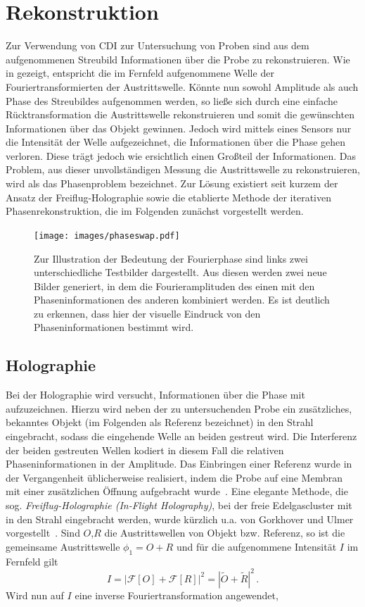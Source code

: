 \chapter{Rekonstruktion}
\label{chap:rekonstruktion}
Zur Verwendung von CDI zur Untersuchung von Proben sind aus dem aufgenommenen Streubild Informationen über die Probe zu rekonstruieren. Wie in  gezeigt, entspricht die im Fernfeld aufgenommene Welle der Fouriertransformierten der Austrittswelle. Könnte nun sowohl Amplitude als auch Phase des Streubildes aufgenommen werden, so ließe sich durch eine einfache Rücktransformation die Austrittswelle rekonstruieren und somit die gewünschten Informationen über das Objekt gewinnen. Jedoch wird mittels eines Sensors nur die Intensität der Welle aufgezeichnet, die Informationen über die Phase gehen verloren. Diese trägt jedoch wie  ersichtlich einen Großteil der Informationen. Das Problem, aus dieser unvollständigen Messung die Austrittswelle zu rekonstruieren, wird als das Phasenproblem bezeichnet. Zur Lösung existiert seit kurzem der Ansatz der Freiflug-Holographie sowie die etablierte Methode der iterativen Phasenrekonstruktion, die im Folgenden zunächst vorgestellt werden.

\begin{figure}
	\centering
	\texttt{[image: images/phaseswap.pdf]}
	\caption[Bedeutung der Fourierphase]{Zur Illustration der Bedeutung der Fourierphase sind links zwei unterschiedliche Testbilder dargestellt. Aus diesen werden zwei neue Bilder generiert, in dem die Fourieramplituden des einen mit den Phaseninformationen des anderen kombiniert werden. Es ist deutlich zu erkennen, dass hier der visuelle Eindruck von den Phaseninformationen bestimmt wird.}
	\label{fig:phaseswap}
\end{figure}

\section{Holographie}
Bei der Holographie wird versucht, Informationen über die Phase mit aufzuzeichnen. Hierzu wird neben der zu untersuchenden Probe ein zusätzliches, bekanntes Objekt (im Folgenden als Referenz bezeichnet) in den Strahl eingebracht, sodass die eingehende Welle an beiden gestreut wird. Die Interferenz der beiden gestreuten Wellen kodiert in diesem Fall die relativen Phaseninformationen in der Amplitude.
Das Einbringen einer Referenz wurde in der Vergangenheit üblicherweise realisiert, indem die Probe auf eine Membran mit einer zusätzlichen Öffnung aufgebracht wurde~\cite{eisebitt2004}. Eine elegante Methode, die sog. \textit{Freiflug-Holographie (In-Flight Holography)}, bei der freie Edelgascluster mit in den Strahl eingebracht werden, wurde kürzlich u.a. von Gorkhover und Ulmer vorgestellt~\cite{gorkhover2016,ulmer2015}. 
Sind $O$,$R$ die Austrittswellen von Objekt bzw. Referenz, so ist  die gemeinsame Austrittswelle $\phi_1=O+R$ und für die aufgenommene Intensität $I$ im Fernfeld gilt
\begin{equation}
	I=\left|\mathscr{F}\left[O\right]+\mathscr{F}\left[R\right]\right|^2=\left|\tilde{O}+\tilde{R}\right|^2\,.
\end{equation}
Wird nun auf $I$ eine inverse Fouriertransformation angewendet,

